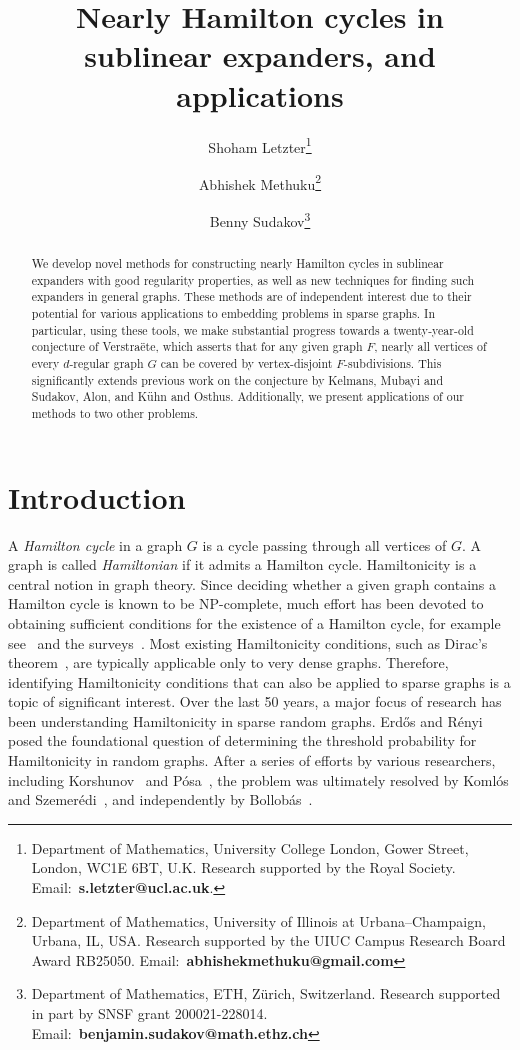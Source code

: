 \documentclass[10pt]{article}
\title{Nearly Hamilton cycles in sublinear expanders, and applications}
\author{Shoham Letzter\thanks{Department of Mathematics, University College London, Gower Street, London, WC1E 6BT, U.K. Research supported by the Royal Society. Email:~\textbf{s.letzter@ucl.ac.uk}.} \and Abhishek Methuku\thanks{Department of Mathematics, University of Illinois at Urbana–Champaign, Urbana, IL, USA. Research supported by the UIUC Campus Research Board Award RB25050. Email:~\textbf{abhishekmethuku@gmail.com}} \and Benny Sudakov\thanks{Department of Mathematics, ETH, Z\"urich, Switzerland. Research supported in part by SNSF grant 200021-228014. Email:~\textbf{benjamin.sudakov@math.ethz.ch}}}
\date{}
\theoremstyle{plain}
\numberwithin{theorem}{section}
\theoremstyle{definition}
\theoremstyle{remark}
\theoremstyle{plain}
\begin{document}
\maketitle
\begin{abstract}

We develop novel methods for constructing nearly Hamilton cycles in sublinear expanders with good regularity properties, as well as new techniques for finding such expanders in general graphs. These methods are of independent interest due to their potential for various applications to embedding problems in sparse graphs. In particular, using these tools, we make substantial progress towards a twenty-year-old conjecture of Verstra\"ete, which asserts that for any given graph $F$, nearly all vertices of every $d$-regular graph $G$ can be covered by vertex-disjoint $F$-subdivisions. This significantly extends previous work on the conjecture by Kelmans, Mubayi and Sudakov, Alon, and K\"uhn and Osthus. Additionally, we present applications of our methods to two other problems.

\end{abstract}


\section{Introduction}

A \emph{Hamilton cycle} in a graph $G$ is a cycle passing through all vertices of $G$. A graph is called \emph{Hamiltonian} if it admits a Hamilton cycle. Hamiltonicity is a central notion in graph theory. Since deciding whether a given graph contains a Hamilton cycle is known to be NP-complete, much effort has been devoted to obtaining sufficient conditions for the existence of a Hamilton cycle, for example see~\cite{ajtai1985first, chvatal1972note, csaba2016proof, cuckler2009hamiltonian, draganic2024hamiltonicity} and the surveys~\cite{gould2014recent, kuhn2014hamilton}. Most existing Hamiltonicity conditions, such as Dirac's theorem~\cite{dirac1952some}, are typically applicable only to very dense graphs. Therefore, identifying Hamiltonicity conditions that can also be applied to sparse graphs is a topic of significant interest. Over the last 50 years, a major focus of research has been understanding Hamiltonicity in sparse random graphs. Erd\H{o}s and R\'enyi~\cite{Erdos:1960} posed the foundational question of determining the threshold probability for Hamiltonicity in random graphs. After a series of efforts by various researchers, including Korshunov~\cite{MR434878} and P\'osa~\cite{MR389666}, the problem was ultimately resolved by Koml\'os and Szemer\'edi~\cite{komlos1983limit}, and independently by Bollob\'as~\cite{MR777163}. 
\end{document}
